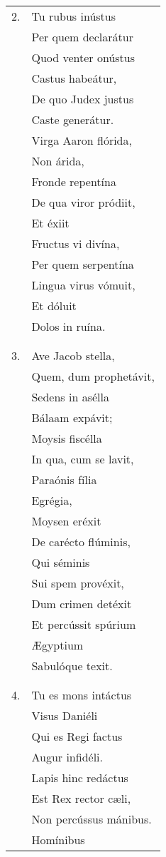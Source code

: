 \begin{longtable}{ll}
2. &Tu rubus inústus\\
&Per quem declarátur\\
&Quod venter onústus\\
&Castus habeátur,\\
&De quo Judex justus\\
&Caste generátur.\\
&Virga Aaron flórida,\\
&Non árida,\\
&Fronde repentína\\
&De qua viror pródiit,\\
&Et éxiit\\
&Fructus vi divína,\\
&Per quem serpentína\\
&Lingua virus vómuit,\\
&Et dóluit\\
&Dolos in ruína.\\
\\\\
3. &Ave Jacob stella,\\
&Quem, dum prophetávit,\\
&Sedens in asélla\\
&Bálaam expávit;\\
&Moysis fiscélla\\
&In qua, cum se lavit,\\
&Paraónis fília\\
&Egrégia,\\
&Moysen eréxit\\
&De carécto flúminis,\\
&Qui séminis\\
&Sui spem provéxit,\\
&Dum crimen detéxit\\
&Et percússit spúrium\\
&Ægyptium\\
&Sabulóque texit.\\
\\\\
4. &Tu es mons intáctus\\
&Visus Daniéli\\
&Qui es Regi factus\\
&Augur infidéli.\\
&Lapis hinc redáctus\\
&Est Rex rector cæli,\\
&Non percússus mánibus.\\
&Homínibus\\

\end{longtable}
